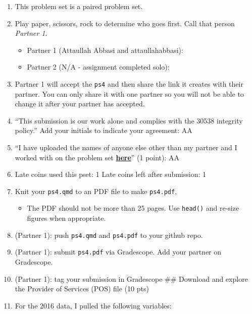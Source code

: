 \documentclass[
  letterpaper,
  DIV=11,
  numbers=noendperiod]{scrartcl}
\providecommand{\tightlist}{%
  \setlength{\itemsep}{0pt}\setlength{\parskip}{0pt}}\usepackage{longtable,booktabs,array}
\begin{document}
\begin{enumerate}
\def\labelenumi{\arabic{enumi}.}
\item
  This problem set is a paired problem set.
\item
  Play paper, scissors, rock to determine who goes first. Call that
  person \emph{Partner 1}.

  \begin{itemize}
  \tightlist
  \item
    Partner 1 (Attaullah Abbasi and attaullahabbasi):
  \item
    Partner 2 (N/A - assignment completed solo):
  \end{itemize}
\item
  Partner 1 will accept the \texttt{ps4} and then share the link it
  creates with their partner. You can only share it with one partner so
  you will not be able to change it after your partner has accepted.
\item
  ``This submission is our work alone and complies with the 30538
  integrity policy.'' Add your initials to indicate your agreement: AA
\item
  ``I have uploaded the names of anyone else other than my partner and I
  worked with on the problem set
  \textbf{\href{https://docs.google.com/forms/d/185usrCREQaUbvAXpWhChkjghdGgmAZXA3lPWpXLLsts/edit}{here}}''
  (1 point): AA
\item
  Late coins used this pset: 1 Late coins left after submission: 1
\item
  Knit your \texttt{ps4.qmd} to an PDF file to make \texttt{ps4.pdf},

  \begin{itemize}
  \tightlist
  \item
    The PDF should not be more than 25 pages. Use \texttt{head()} and
    re-size figures when appropriate.
  \end{itemize}
\item
  (Partner 1): push \texttt{ps4.qmd} and \texttt{ps4.pdf} to your github
  repo.
\item
  (Partner 1): submit \texttt{ps4.pdf} via Gradescope. Add your partner
  on Gradescope.
\item
  (Partner 1): tag your submission in Gradescope \#\# Download and
  explore the Provider of Services (POS) file (10 pts)
\item
  For the 2016 data, I pulled the following variables:


\end{enumerate}
\end{document}
